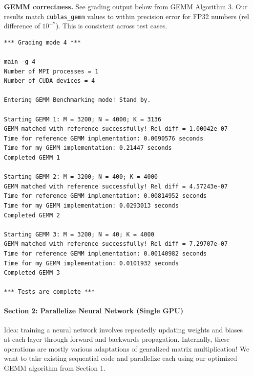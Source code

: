 \documentclass[12pt,letterpaper,twoside]{article}
\begin{document}
\textbf{GEMM correctness.} See grading output below from GEMM Algorithm 3. Our
results match \texttt{cublas\_gemm} values to within precision error for
FP32 numbers (rel difference of $10^{-7}$). This is consistent across test
cases.

\begin{verbatim}
*** Grading mode 4 ***

main -g 4
Number of MPI processes = 1
Number of CUDA devices = 4

Entering GEMM Benchmarking mode! Stand by.

Starting GEMM 1: M = 3200; N = 4000; K = 3136
GEMM matched with reference successfully! Rel diff = 1.00042e-07
Time for reference GEMM implementation: 0.0690576 seconds
Time for my GEMM implementation: 0.21447 seconds
Completed GEMM 1

Starting GEMM 2: M = 3200; N = 400; K = 4000
GEMM matched with reference successfully! Rel diff = 4.57243e-07
Time for reference GEMM implementation: 0.00814952 seconds
Time for my GEMM implementation: 0.0293013 seconds
Completed GEMM 2

Starting GEMM 3: M = 3200; N = 40; K = 4000
GEMM matched with reference successfully! Rel diff = 7.29707e-07
Time for reference GEMM implementation: 0.00140982 seconds
Time for my GEMM implementation: 0.0101932 seconds
Completed GEMM 3

*** Tests are complete ***
\end{verbatim}

\pagebreak
\paragraph{Section 2: Parallelize Neural Network (Single GPU)} Idea: training a neural
network involves repeatedly updating weights and biases at each layer through forward
and backwards propagation. Internally, these operations are mostly various adaptations
of genralized matrix multiplication! We want to take existing sequential code and
parallelize each using our optimized GEMM algorithm from Section 1.
\end{document}
